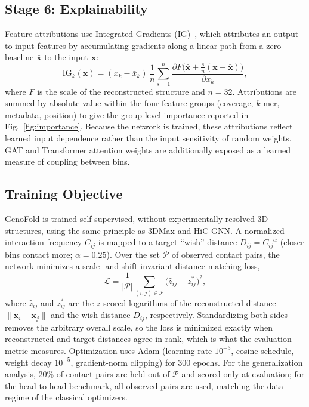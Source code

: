 \documentclass[conference]{IEEEtran}
\begin{document}
\subsection{Stage 6: Explainability}
\label{sec:explain}
Feature attributions use Integrated Gradients (IG)~\cite{sundararajan2017}, which
attributes an output to input features by accumulating gradients along a linear
path from a zero baseline $\bar{\mathbf{x}}$ to the input $\mathbf{x}$:
\begin{equation}
\mathrm{IG}_k(\mathbf{x}) = (x_k - \bar{x}_k)\,\frac{1}{n}\sum_{s=1}^{n}
\frac{\partial F\big(\bar{\mathbf{x}} + \tfrac{s}{n}(\mathbf{x} - \bar{\mathbf{x}})\big)}{\partial x_k},
\end{equation}
where $F$ is the scale of the reconstructed structure and $n = 32$. Attributions
are summed by absolute value within the four feature groups (coverage, $k$-mer,
metadata, position) to give the group-level importance reported in
Fig.~\ref{fig:importance}. Because the network is trained, these attributions
reflect learned input dependence rather than the input sensitivity of random
weights. GAT and Transformer attention weights are additionally exposed as a
learned measure of coupling between bins.

\subsection{Training Objective}
\label{sec:objective}
GenoFold is trained self-supervised, without experimentally resolved 3D structures,
using the same principle as 3DMax and HiC-GNN. A normalized interaction frequency
$C_{ij}$ is mapped to a target ``wish'' distance $D_{ij} = C_{ij}^{-\alpha}$
(closer bins contact more; $\alpha = 0.25$). Over the set $\mathcal{P}$ of observed
contact pairs, the network minimizes a scale- and shift-invariant distance-matching
loss,
\begin{equation}
\mathcal{L} = \frac{1}{|\mathcal{P}|}\sum_{(i,j)\in\mathcal{P}}
\Big(\hat{z}_{ij} - z^{\ast}_{ij}\Big)^2,
\label{eq:loss}
\end{equation}
where $\hat{z}_{ij}$ and $z^{\ast}_{ij}$ are the $z$-scored logarithms of the
reconstructed distance $\|\mathbf{x}_i-\mathbf{x}_j\|$ and the wish distance
$D_{ij}$, respectively. Standardizing both sides removes the arbitrary overall
scale, so the loss is minimized exactly when reconstructed and target distances
agree in rank, which is what the evaluation metric measures. Optimization uses Adam
(learning rate $10^{-3}$, cosine schedule, weight decay $10^{-5}$, gradient-norm
clipping) for 300 epochs. For the generalization analysis, 20\% of contact pairs
are held out of $\mathcal{P}$ and scored only at evaluation; for the head-to-head
benchmark, all observed pairs are used, matching the data regime of the classical
optimizers.
\end{document}
